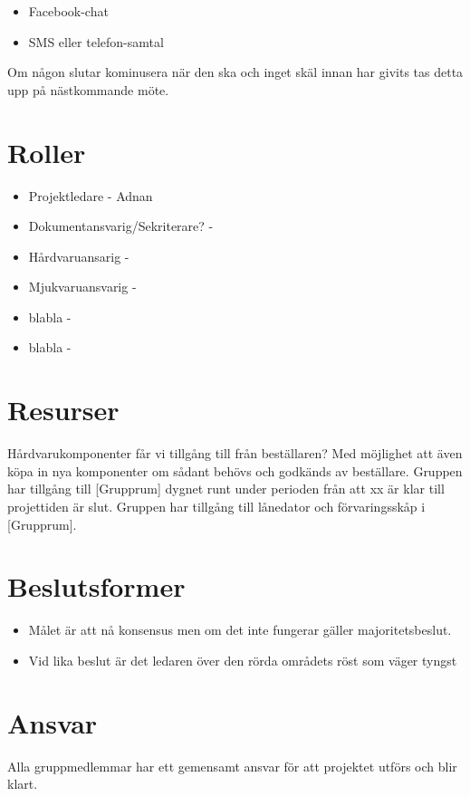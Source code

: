 \documentclass[11pt]{article}
\begin{document}
\begin{flushleft}
\begin{itemize}
\item Facebook-chat

\item SMS eller telefon-samtal

\end{itemize}

Om någon slutar kominusera när den ska och inget skäl innan har givits tas detta upp på nästkommande möte. 

\section{Roller}

\begin{itemize}
\item Projektledare - Adnan
\item Dokumentansvarig/Sekriterare? - 
\item Hårdvaruansarig -  
\item Mjukvaruansvarig - 
\item blabla - 
\item blabla - 

\end{itemize}

\section{Resurser}
Hårdvarukomponenter får vi tillgång till från beställaren? Med möjlighet att även köpa in nya komponenter om sådant behövs och godkänds av beställare. Gruppen har tillgång till [Grupprum] dygnet runt under perioden från att xx är klar till projettiden är slut.
Gruppen har tillgång till lånedator och förvaringsskåp i [Grupprum].


\section{Beslutsformer}

\begin{itemize}
\item Målet är att nå konsensus men om det inte fungerar gäller majoritetsbeslut.

\item Vid lika beslut är det ledaren över den rörda områdets röst som väger tyngst


\end{itemize}


\section{Ansvar}
Alla gruppmedlemmar har ett gemensamt ansvar för att projektet utförs och blir klart. 


\end{flushleft}
\end{document}
